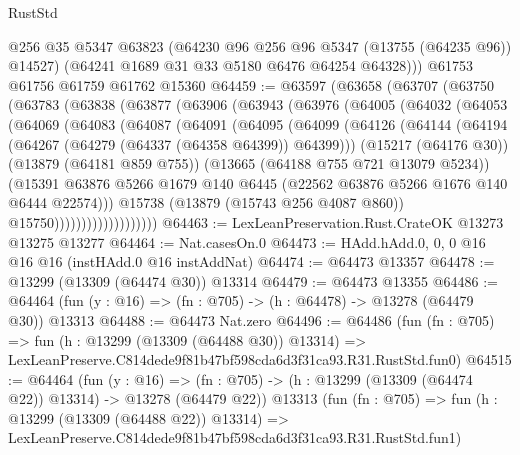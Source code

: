\begin{lexlean}{RustStd}
\begin{coremodule}
        @256
        @35
        @5347
        @63823
        (@64230 @96 @256 @96 @5347 (@13755 (@64235 @96)) @14527)
        (@64241 @1689 @31 @33 @5180 @6476 @64254 @64328)))
    @61753
    @61756
    @61759
    @61762
    @15360
@64459 := @63597
    (@63658
      (@63707
        (@63750
          (@63783
            (@63838
              (@63877
                (@63906
                  (@63943
                    (@63976
                      (@64005
                        (@64032
                          (@64053
                            (@64069
                              (@64083
                                (@64087
                                  (@64091
                                    (@64095
                                      (@64099
                                        (@64126
                                          (@64144
                                            (@64194
                                              (@64267 (@64279 (@64337 (@64358 @64399)) @64399)))
                                            (@15217 (@64176 @30))
                                            (@13879 (@64181 @859 @755))
                                            (@13665 (@64188 @755 @721 @13079 @5234))
                                            (@15391
                                              @63876
                                              @5266
                                              @1679
                                              @140
                                              @6445
                                              (@22562 @63876 @5266 @1676 @140 @6444 @22574)))
                                          @15738
                                          (@13879 (@15743 @256 @4087 @860))
                                          @15750)))))))))))))))))))
@64463 := LexLeanPreservation.Rust.CrateOK @13273 @13275 @13277
@64464 := Nat.casesOn.{0}
@64473 := HAdd.hAdd.{0, 0, 0} @16 @16 @16 (instHAdd.{0} @16 instAddNat)
@64474 := @64473 @13357
@64478 := @13299 (@13309 (@64474 @30)) @13314
@64479 := @64473 @13355
@64486 := @64464 (fun (y : @16) => (fn : @705) -> (h : @64478) -> @13278 (@64479 @30)) @13313
@64488 := @64473 Nat.zero
@64496 := @64486
    (fun (fn : @705) =>
    fun (h : @13299 (@13309 (@64488 @30)) @13314) =>
    LexLeanPreserve.C814dede9f81b47bf598cda6d3f31ca93.R31.RustStd.fun0)
@64515 := @64464
    (fun (y : @16) =>
    (fn : @705) -> (h : @13299 (@13309 (@64474 @22)) @13314) -> @13278 (@64479 @22))
    @13313
    (fun (fn : @705) =>
    fun (h : @13299 (@13309 (@64488 @22)) @13314) =>
    LexLeanPreserve.C814dede9f81b47bf598cda6d3f31ca93.R31.RustStd.fun1)

\end{coremodule}
\end{lexlean}
